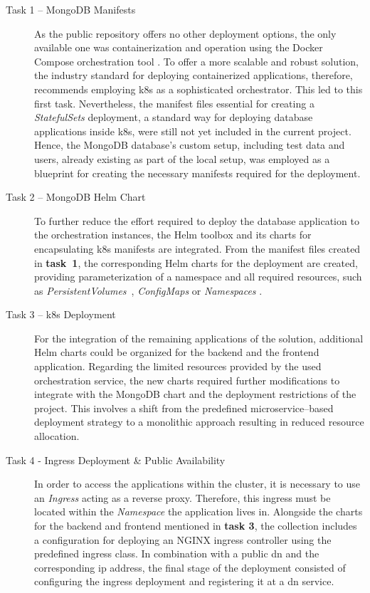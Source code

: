 \begin{description}
    \item[Task 1 -- MongoDB Manifests] As the public repository offers no other deployment options, the only available one was containerization and operation using the Docker Compose orchestration tool \cite{noauthor_overview_2023}.
    To offer a more scalable and robust solution, the industry standard for deploying containerized applications, therefore, recommends employing \acrfull{k8s} \cite{noauthor_produktionsreife_nodate} as a sophisticated orchestrator. This led to this first task.
    Nevertheless, the manifest files essential for creating a \textit{StatefulSets} \cite{noauthor_statefulsets_nodate} deployment, a standard way for deploying database applications inside \acrshort{k8s}, were still not yet included in the current project.
    Hence, the MongoDB \cite{noauthor_mongodb_nodate} database's custom setup, including test data and users, already existing as part of the local setup, was employed as a blueprint for creating the necessary manifests required for the deployment.
    \item[Task 2 -- MongoDB Helm Chart] To further reduce the effort required to deploy the database application to the orchestration instances, the Helm \cite{noauthor_helm_nodate} toolbox and its charts for encapsulating \acrshort{k8s} manifests are integrated.
    From the manifest files created in \textbf{task~1}, the corresponding Helm charts for the deployment are created, providing parameterization of a namespace and all required resources, such as \textit{PersistentVolumes}~\cite{noauthor_persistent_nodate}, \textit{ConfigMaps} \cite{noauthor_configmaps_nodate} or \textit{Namespaces} \cite{noauthor_namespaces_nodate}.
    \item[Task 3 -- \acrshort{k8s} Deployment] For the integration of the remaining applications of the solution, additional Helm charts could be organized for the backend and the frontend application.
    Regarding the limited resources provided by the used orchestration service, the new charts required further modifications to integrate with the MongoDB chart and the deployment restrictions of the project. This involves a shift from the predefined microservice--based deployment strategy to a monolithic approach resulting in reduced resource allocation.
    \item[Task 4 - Ingress Deployment \& Public Availability] In order to access the applications within the cluster, it is necessary to use an \textit{Ingress} \cite{noauthor_ingress_nodate} acting as a reverse proxy.
    Therefore, this ingress must be located within the \textit{Namespace} the application lives in.
    Alongside the charts for the backend and frontend mentioned in \textbf{task 3}, the collection includes a configuration for deploying an NGINX ingress controller \cite{noauthor_nginx_nodate} using the predefined ingress class.
    In combination with a public \acrshort{dn} and the corresponding \acrshort{ip} address, the final stage of the deployment consisted of configuring the ingress deployment and registering it at a \acrshort{dn} service.
\end{description}

